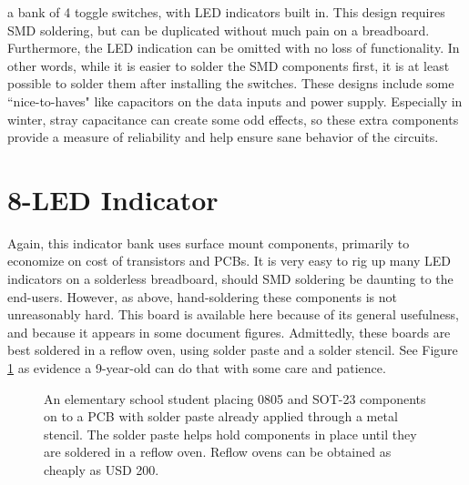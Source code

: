 \documentclass[12pt]{article}
\begin{document}
a bank of 4 toggle switches, with LED indicators built in. This design requires SMD soldering, but can be duplicated without much pain on a breadboard. Furthermore, the LED indication can be omitted with no loss of functionality. In other words, while it is easier to solder the SMD components first, it is at least possible to solder them after installing the switches. These designs include some ``nice-to-haves" like  capacitors on the data inputs and power supply. Especially in winter, stray capacitance can create some odd effects, so these extra components provide a measure of reliability and help ensure sane behavior of the circuits.



\section{8-LED Indicator}

Again, this indicator bank uses surface mount components, primarily to economize on cost of transistors and PCBs. It is very easy to rig up many LED indicators on a solderless breadboard, should SMD soldering be daunting to the end-users. However, as above, hand-soldering these components is not unreasonably hard. This board is available here because of its general usefulness, and because it appears in some document figures. Admittedly, these boards are best soldered in a reflow oven, using solder paste and a solder stencil. See Figure \ref{fig:smds} as evidence a 9-year-old can do that with some care and patience.

\begin{figure}[!hb]
\begin{center}
\medskip
\caption{An elementary school student placing 0805 and SOT-23 components on to a PCB with solder paste already applied through a metal stencil. The solder paste helps hold components in place until they are soldered in a reflow oven. Reflow ovens can be obtained as cheaply as USD 200.}
\label{fig:smds}
\end{center}
\end{figure}


\end{document}
